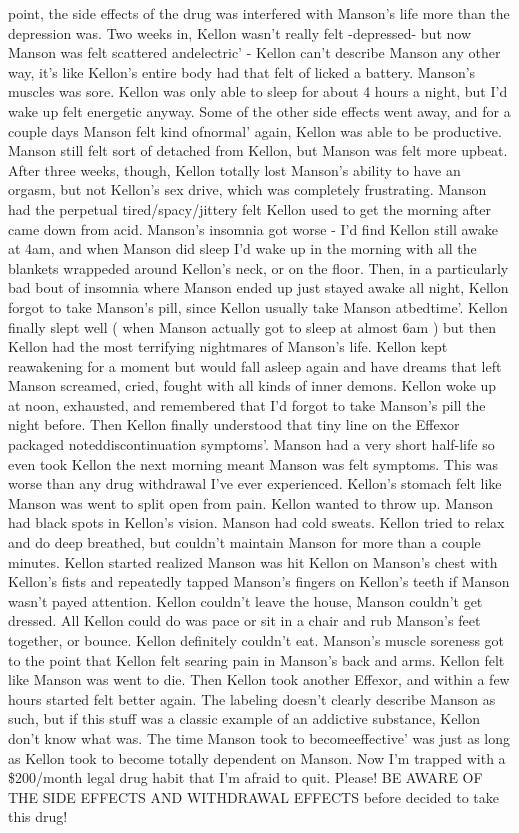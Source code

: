 \documentclass[12pt]{book}
\begin{document}
point, the side effects of the drug was interfered with Manson's life more than the depression was. Two weeks in, Kellon wasn't really felt -depressed- but now Manson was felt scattered andelectric' - Kellon can't describe Manson any other way, it's like Kellon's entire body had that felt of licked a battery. Manson's muscles was sore. Kellon was only able to sleep for about 4 hours a night, but I'd wake up felt energetic anyway. Some of the other side effects went away, and for a couple days Manson felt kind ofnormal' again, Kellon was able to be productive. Manson still felt sort of detached from Kellon, but Manson was felt more upbeat. After three weeks, though, Kellon totally lost Manson's ability to have an orgasm, but not Kellon's sex drive, which was completely frustrating. Manson had the perpetual tired/spacy/jittery felt Kellon used to get the morning after came down from acid. Manson's insomnia got worse - I'd find Kellon still awake at 4am, and when Manson did sleep I'd wake up in the morning with all the blankets wrappeded around Kellon's neck, or on the floor. Then, in a particularly bad bout of insomnia where Manson ended up just stayed awake all night, Kellon forgot to take Manson's pill, since Kellon usually take Manson atbedtime'. Kellon finally slept well ( when Manson actually got to sleep at almost 6am ) but then Kellon had the most terrifying nightmares of Manson's life. Kellon kept reawakening for a moment but would fall asleep again and have dreams that left Manson screamed, cried, fought with all kinds of inner demons. Kellon woke up at noon, exhausted, and remembered that I'd forgot to take Manson's pill the night before. Then Kellon finally understood that tiny line on the Effexor packaged noteddiscontinuation symptoms'. Manson had a very short half-life so even took Kellon the next morning meant Manson was felt symptoms. This was worse than any drug withdrawal I've ever experienced. Kellon's stomach felt like Manson was went to split open from pain. Kellon wanted to throw up. Manson had black spots in Kellon's vision. Manson had cold sweats. Kellon tried to relax and do deep breathed, but couldn't maintain Manson for more than a couple minutes. Kellon started realized Manson was hit Kellon on Manson's chest with Kellon's fists and repeatedly tapped Manson's fingers on Kellon's teeth if Manson wasn't payed attention. Kellon couldn't leave the house, Manson couldn't get dressed. All Kellon could do was pace or sit in a chair and rub Manson's feet together, or bounce. Kellon definitely couldn't eat. Manson's muscle soreness got to the point that Kellon felt searing pain in Manson's back and arms. Kellon felt like Manson was went to die. Then Kellon took another Effexor, and within a few hours started felt better again. The labeling doesn't clearly describe Manson as such, but if this stuff was a classic example of an addictive substance, Kellon don't know what was. The time Manson took to becomeeffective' was just as long as Kellon took to become totally dependent on Manson. Now I'm trapped with a \$200/month legal drug habit that I'm afraid to quit. Please! BE AWARE OF THE SIDE EFFECTS AND WITHDRAWAL EFFECTS before decided to take this drug!
\end{document}
